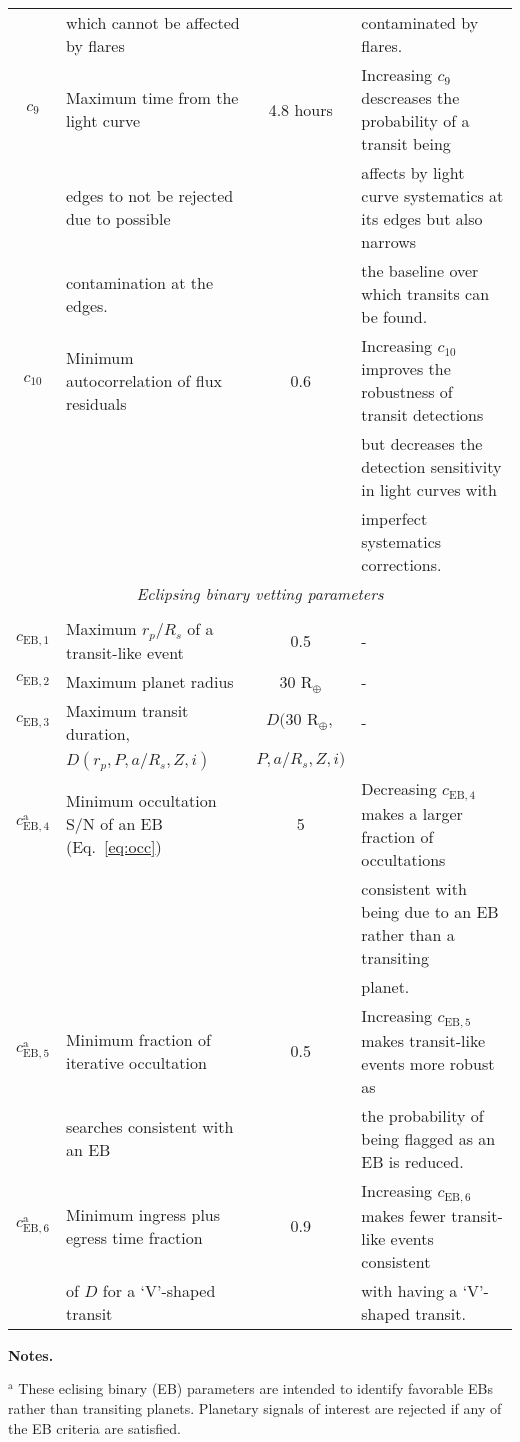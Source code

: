 \begin{landscape}
\begin{table*}
\begin{tabular}{clcl}
    & which cannot be affected by flares &&
    contaminated by flares. \\
    $c_9$ & Maximum time from the light curve & 4.8 hours &
    Increasing $c_9$ descreases the probability of a transit being \\
    & edges to not be rejected due to possible &&
    affects by light curve systematics at its edges but also narrows \\
    &  contamination at the edges. &&
    the baseline over which transits can be found. \\
    $c_{10}$ & Minimum autocorrelation of flux residuals & 0.6 &
    Increasing $c_{10}$ improves the robustness of transit detections \\
    &&& but decreases the detection sensitivity in light curves with \\
    &&& imperfect systematics corrections. \\
    \multicolumn{4}{c}{\emph{Eclipsing binary vetting parameters}} \\
    \hline \\
    $c_{\text{EB},1}$ & Maximum $r_p/R_s$ of a  transit-like event & 0.5 & - \\
    $c_{\text{EB},2}$ & Maximum planet radius & 30 R$_{\oplus}$ & - \\
    $c_{\text{EB},3}$ & Maximum transit duration, & $D(30\text{ R}_{\oplus},$ & - \\
    & $D(r_p,P,a/R_s,Z,i)$ & $P,a/R_s,Z,i)$ & \\
    $c_{\text{EB},4}^{\text{a}}$ & Minimum occultation S/N of an EB (Eq.~\ref{eq:occ}) & 5 &
    Decreasing $c_{\text{EB},4}$ makes a larger fraction of occultations \\
    &&& consistent with being due to an EB rather than a transiting \\
    &&& planet. \\
    $c_{\text{EB},5}^{\text{a}}$ & Minimum fraction of iterative occultation & 0.5 &
    Increasing $c_{\text{EB},5}$ makes transit-like events more robust as \\
    & searches consistent with an EB & &
    the probability of being flagged as an EB is reduced. \\ 
    $c_{\text{EB},6}^{\text{a}}$ & Minimum ingress plus egress time fraction & 0.9 &
    Increasing $c_{\text{EB},6}$ makes fewer transit-like events consistent \\
    & of $D$ for a `V'-shaped transit && with having a `V'-shaped transit. \\
  \end{tabular}
  \begin{list}{}{}
  \item {\bf{Notes.}}
  \item $^{\text{a}}$ These eclising binary (EB) parameters are intended to identify favorable EBs rather than transiting planets. Planetary signals of interest are rejected if any of the EB criteria are satisfied.
    \end{list}
\end{table*}
\clearpage
\end{landscape}
